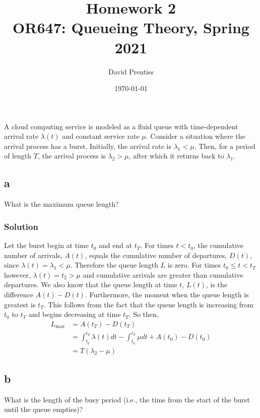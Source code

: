 \documentclass[letterpaper]{amsart}
\title[Homework 2]{Homework 2 \\ OR647: Queueing Theory, Spring 2021}
\author{David Prentiss}
\date{\today}
\begin{document}
\maketitle

\section{} %
A cloud computing service is modeled as a fluid queue with time-dependent
arrival rate $\lambda(t)$ and constant service rate $\mu$. Consider a situation where the
arrival process has a burst. Initially, the arrival rate is $\lambda_1<\mu$. Then, for a
period of length $T$, the arrival process is $\lambda_2>\mu$, after which it
returns back to $\lambda_1$.

\subsection*{a}
What is the maximum queue length?
\subsubsection*{Solution}
Let the burst begin at time $t_0$ and end at $t_T$. For times $t<t_0$, the
cumulative number of arrivals, $A(t)$, equals the cumulative number of
departures, $D(t)$, since $\lambda(t) = \lambda_1 < \mu$. Therefore the queue
length $L$ is zero. For times $t_0\leq t<t_T$ however, $\lambda(t) = t_2 > \mu$
and cumulative arrivals are greater than cumulative departures. We also know
that the queue length at time $t$, $L(t)$, is the difference $A(t)-D(t)$.
Furthermore, the moment when the queue length is greatest is $t_T$. This follows
from the fact that the queue length is increasing from $t_0$ to $t_T$ and begins
decreasing at time $t_T$. So then,
\begin{align}
  L_\text{max} &= A(t_T) - D(t_T) \\
  &= \int_{t_0}^{t_T}\lambda(t)dt - \int_{t_0}^{t_T}\mu dt + A(t_0)-D(t_0) \\
  &= T(\lambda_2 - \mu)
\end{align}

\subsection*{b}
What is the length of the busy period (i.e., the time from the start of the burst until the
queue empties)?
\end{document}
